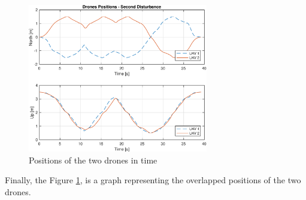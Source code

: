 \begin{figure}
\centering
\includegraphics[width=0.7\textwidth]{chapters/chapter-04/figures/overlapped_2.eps}
\caption{Positions of the two drones in time}
\label{fig:overlapped_2}
\end{figure}


Finally, the Figure \ref{fig:overlapped_2}, is a graph representing the overlapped
positions of the two drones.
